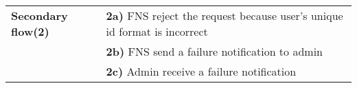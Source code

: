 \documentclass[a4paper,11pt]{article}
\begin{document}
\begin{tabular}{|p{3.5cm}|p{11.5cm}|}
    \\ \hline \rowcolor{Gray} & \\ \hline 
     
    \textbf{Secondary flow(2)} & 
    \textbf{2a)} FNS reject the request because user's unique id format is incorrect \\&
    \textbf{2b)} FNS send a failure notification to admin\\&
    \textbf{2c)} Admin receive a failure notification
    \\ \hline 
\end{tabular}
\end{document}
